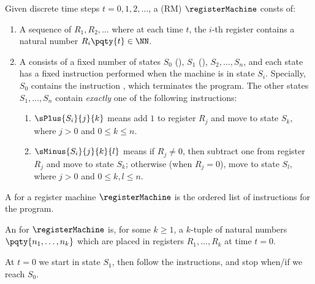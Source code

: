 \begin{definition}
    Given discrete time steps \(t = 0, 1, 2, \ldots\), a  (RM) \(\registerMachine\) consts of:
    \begin{enumerate}[label=(\alph*)]
        \item A sequence of  \(R_1, R_2, \ldots\) where at each time \(t\), the \(i\)-th register contains a natural number \(R_i\pqty{t} \in \NN\).
        \item A  consists of a  fixed number of states \(S_0\) (), \(S_1\) (), \(S_2, \ldots, S_n\), and each state has a fixed instruction performed when the machine is in state \(S_i\). Specially, \(S_0\) contains the instruction , which terminates the program. The other states \(S_1, \ldots, S_n\) contain \emph{exactly} one of the following instructions:
        \begin{enumerate}[label=\arabic*.]
            \item \(\sPlus{S_i}{j}{k}\) means add \(1\) to register \(R_j\) and move to state \(S_k\), where \(j > 0\) and \(0 \leq k \leq n\).
            \item \(\sMinus{S_i}{j}{k}{l}\) means if \(R_j \neq 0\), then subtract one from register \(R_j\) and move to state \(S_k\); otherwise (when \(R_j = 0\)), move to state \(S_l\), where \(j > 0\) and \(0 \leq k, l \leq n\).
        \end{enumerate}
    \end{enumerate}
\end{definition}

\begin{definition}
    A  for a register machine \(\registerMachine\) is the ordered list of instructions for the program.

    An  for \(\registerMachine\) is, for some \(k \geq 1\), a \(k\)-tuple of natural numbers \(\pqty{n_1, \ldots, n_k}\) which are placed in registers \(R_1, \ldots, R_k\) at time \(t = 0\).

    At \(t = 0\) we start in state \(S_1\), then follow the instructions, and stop when/if we reach \(S_0\).
\end{definition}


